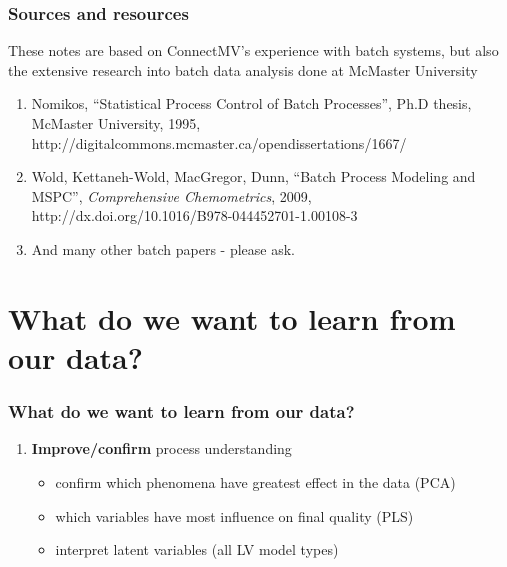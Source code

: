 
\begin{frame}\frametitle{Sources and resources}

These notes are based on ConnectMV's experience with batch systems, but also the extensive research into batch data analysis done at McMaster University

\begin{enumerate}

	\item	Nomikos, ``Statistical Process Control of Batch Processes'', Ph.D thesis, McMaster University, 1995, {\scriptsize http://digitalcommons.mcmaster.ca/opendissertations/1667/}
	
	
	\item	Wold, Kettaneh-Wold, MacGregor, Dunn, ``Batch Process Modeling and MSPC'', \emph{Comprehensive Chemometrics}, 2009, {\scriptsize http://dx.doi.org/10.1016/B978-044452701-1.00108-3}
		
	\item	And many other batch papers - please ask.
\end{enumerate}
\end{frame}

\section{What do we want to learn from our data?}

\begin{frame}\frametitle{What do we want to learn from our data?}

\begin{enumerate}
	\item {\bf \color{myGreen}Improve/confirm} process understanding
\begin{itemize}

	\item	confirm which phenomena have greatest effect in the data (PCA)

	\item	which variables have most influence on final quality (PLS)

	\item	interpret latent variables (all LV model types)

\end{itemize}
\end{enumerate}
\end{frame}

